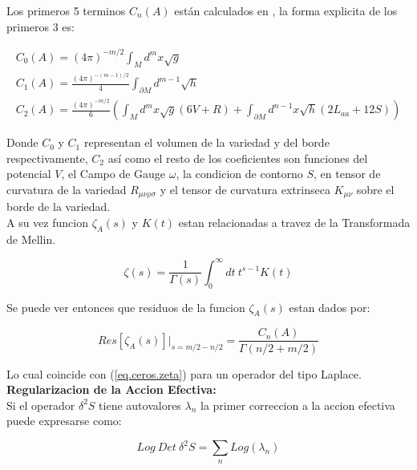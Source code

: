 Los primeros 5 terminos $C _n (A) $ están calculados en \cite{VASSILEVICH2003279}, la forma explicita de los primeros 3 es: 

\begin{equation}
\begin{array}{c}
C _0 (A) = (4 \pi ) ^{-m/2}  \int _M d ^m x \sqrt{g}  \\
C _1 (A) = \frac{(4 \pi) ^{-(m-1)/2} }{4} \int _{\partial M } d ^{m-1} \sqrt{h} \\
C _2 (A) = \frac{(4 \pi) ^{-m/2} }{6} \left(
									\int _M d ^m x\sqrt{g} (6 V + R) +
									\int _{\partial M } d ^{n-1} x 
									\sqrt{h} (2 L _{aa}  + 12 S)
									\right)
\end{array}
\end{equation} 

Donde $C _0$ y $C _1$ representan el volumen de la variedad y del borde respectivamente, $C _2$ así como el resto de los coeficientes son funciones del potencial $V$, el Campo de Gauge $\omega $, la condicion de contorno $S$, en tensor de curvatura de la variedad $R _{\mu \nu \rho \sigma }$ y el tensor de curvatura extrinseca $K _{\mu \nu }$ sobre el borde de la variedad. \\

A su vez funcion $\zeta _A (s) $ y $K(t)$ estan relacionadas a travez de la Transformada de Mellin.



\begin{equation}
\zeta (s) = \frac{1}{\Gamma (s) } 
\int _0 ^{\infty} dt \
t ^{s-1} K(t) 
\end{equation}

Se puede ver entonces que residuos de la funcion $\zeta _A (s)$ estan dados por:

\begin{equation}
Res[\zeta _A (s)] | _{s= m/2 - n/2} = \frac{C _n (A)}{\Gamma (n/2 + m/2)}
\end{equation}

Lo cual coincide con (\ref{eq.ceros.zeta}) para un operador del tipo Laplace. \\

\textbf{Regularizacion de la Accion Efectiva:} \\

Si el operador $\delta ^2 S$ tiene autovalores $\lambda _n$ la primer correccion a la accion efectiva puede expresarse como:

\begin{equation}
Log \ Det \ \delta ^2 S = 
\sum _n Log( \lambda _n )
\end{equation}

